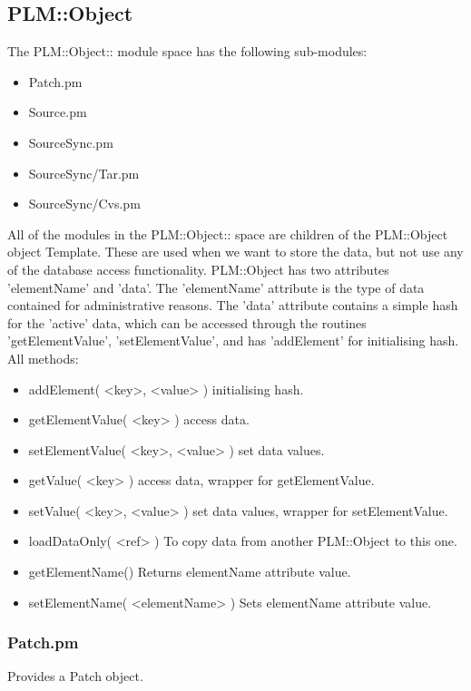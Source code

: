 \subsection{PLM::Object}
The PLM::Object:: module space has the following sub-modules:

\begin{itemize}
\item Patch.pm
\item Source.pm
\item SourceSync.pm
\item SourceSync/Tar.pm
\item SourceSync/Cvs.pm
\end{itemize}

All of the modules in the PLM::Object:: space are children of the PLM::Object object Template.
These are used when we want to store the data, but not use any of the database access 
functionality.
PLM::Object has two attributes 'elementName' and 'data'.  The 'elementName' attribute is 
the type of data contained for administrative reasons.  The 'data' attribute contains a simple 
hash for the 'active' data, which can be accessed through the routines 'getElementValue', 
'setElementValue', and has 'addElement' for initialising hash.  All methods:

\begin{itemize}
\item addElement( <key>, <value> )  initialising hash.
\item getElementValue( <key> )  access data.
\item setElementValue( <key>, <value> )  set data values.
\item getValue( <key> )  access data, wrapper for getElementValue.
\item setValue( <key>, <value> )  set data values, wrapper for setElementValue.
\item loadDataOnly( <ref> ) To copy data from another PLM::Object to this one.
\item getElementName()  Returns elementName attribute value.
\item setElementName( <elementName> )  Sets elementName attribute value.
\end{itemize}


\subsubsection{Patch.pm}
Provides a Patch object.

